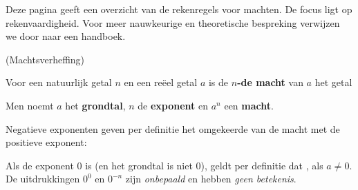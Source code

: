 \documentclass{ximera}
\begin{document}
	\author{Wiskundeplan}

Deze pagina geeft een overzicht van de rekenregels voor machten. 
De focus ligt op rekenvaardigheid. Voor meer nauwkeurige en theoretische bespreking verwijzen we door naar een handboek. 


\handouttrue

\begin{definition}(Machtsverheffing) \label{def:machten_light}\label{def:machten met gehele exponent}\
    
        
    
    Voor een natuurlijk getal $n$ en een reëel getal $a$ is de \textbf{$n$-de macht} van $a$ het getal
    
    Men noemt $a$ het \textbf{grondtal},  $n$ de \textbf{exponent} en $a^n$  een \textbf{macht}.
            
    Negatieve exponenten geven per definitie het omgekeerde van de macht met de positieve exponent:
    
    
    Als de exponent 0 is (en het grondtal is niet 0), geldt per definitie dat  , als $a\neq0$.
    \\
    De uitdrukkingen $0^0$ en $0^{-n}$ zijn \textit{onbepaald} en hebben \textit{geen betekenis}.

\end{definition}
\end{document}
